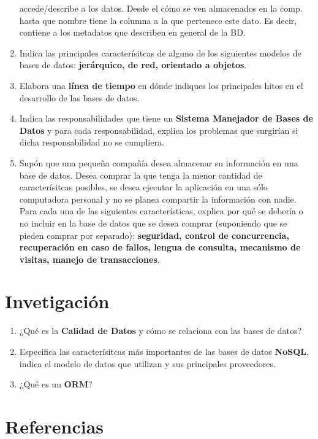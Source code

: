 \documentclass{article}
\begin{document}
\begin{enumerate}[label=\alph*.]
{                accede/describe a los datos. Desde el cómo se ven almacenados en la comp.
                hasta que nombre tiene la columna a la que pertenece este dato. Es decir,
                contiene a los metadatos que describen en general de la BD.
            }
        \item {
            Indica las principales caracterísitcas de alguno de los siguientes 
            modelos de bases de datos: \textbf{jerárquico, de red, orientado 
            a objetos}.
        }
        \item {
            Elabora una \textbf{línea de tiempo} en dónde indiques los principales
            hitos en el desarrollo de las bases de datos.
            }
        \item {
            Indica las responsabilidades que tiene un \textbf{Sistema Manejador
            de Bases de Datos} y para cada responsabilidad, explica los problemas
            que surgirían si dicha responsabilidad no se cumpliera.
        }
        \item {
            Supón que una pequeña compañía desea almacenar su información en una
            base de datos. Desea comprar la que tenga la menor cantidad de 
            caracterísitcas posibles, se desea ejecutar la aplicación en una 
            sólo computadora personal y no se planea compartir la información con
            nadie. Para cada una de las siguientes características, explica por
            qué se debería o no incluir en la base de datos que se desea comprar
            (suponiendo que se pieden comprar por separado): \textbf{seguridad, 
            control de concurrencia, recuperación en caso de fallos, lengua de 
            consulta, mecanismo de visitas, manejo de transacciones}.
        }
    \end{enumerate}

    \section{Invetigación}
    \begin{enumerate}[label=\alph*.]
        \item {
            ¿Qué es la \textbf{Calidad de Datos} y cómo se relaciona con las 
            bases de datos?
        }
        \item {
            Especifica las caracterísitcas más importantes de las bases de datos
            \textbf{NoSQL}, indica el modelo de datos que utilizan y sus 
            principales proveedores.
        }
        \item {
            ¿Qué es un \textbf{ORM}?
        }
    \end{enumerate}

    \section{Referencias}
\end{document}
